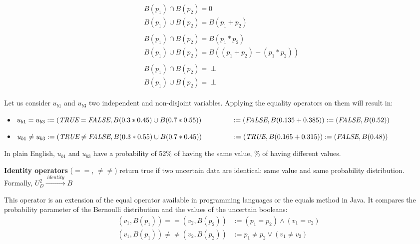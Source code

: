 \begin{align}
	\tag{Disjoint var.}
	\begin{split}
		& B(p_1) \cap B(p_2) = 0\\
		& B(p_1) \cup B(p_2) = B(p_1 + p_2)
	\end{split}\\
	\tag{Indep. and non-disjoint var.}
	\begin{split}
		& B(p_1) \cap B(p_2) = B(p_1 * p_2)\\
		& B(p_1) \cup B(p_2) = B((p_1 + p_2) - (p_1 * p_2))
	\end{split}\\
	\tag{Dep. and non-disjoint var.}
	\begin{split}
		& B(p_1) \cap B(p_2) = \perp\\
		& B(p_1) \cup B(p_2) = \perp
	\end{split}
\end{align}

Let us consider $u_{b1}$ and $u_{b3}$ two independent and non-disjoint variables.
Applying the equality operators on them will result in:
\begin{itemize}
	\setlength\itemsep{-0.3em}
	\item $u_{b1} = u_{b3} := (\textit{TRUE}{} = \textit{FALSE}{}, B(0.3*0.45) \cup B(0.7*0.55))\\ ~~~~~~~~~~~~~ := (\textit{FALSE}{}, B(0.135 + 0.385)) := (\textit{FALSE}{}, B(0.52))$
	\item $u_{b1} \ne u_{b3} := (\textit{TRUE}{} \ne \textit{FALSE}{}, B(0.3*0.55) \cup B(0.7*0.45))\\ ~~~~~~~~~~~~~ := (\textit{TRUE}{}, B(0.165 + 0.315)) := (\textit{FALSE}{}, B(0.48))$
\end{itemize}
In plain English, $u_{b1}$ and $u_{b3}$ have a probability of 52\% of having the same value, \% of having different values.

\begin{operator}
	\label{op:s-equality}
	\textbf{Identity operators} ($==$, $\neq\neq$) return true if two uncertain data are identical: same value and same probability distribution. Formally, $U_D^2 \xrightarrow{~identity~} B$
\end{operator}

This operator is an extension of the equal operator available in programming languages or the equals method in Java.
It compares the probability parameter of the Bernoulli distribution and the values of the uncertain booleans:
\begin{align*}
	(v_1, B(p_1)) == (v_2, B(p_2)) &:= (p_1 = p_2) \land (v_1 = v_2)\\
	(v_1, B(p_1)) \ne\ne (v_2, B(p_2)) &:= p_1 \ne p_2 \lor (v_1 \ne v_2)
\end{align*}

